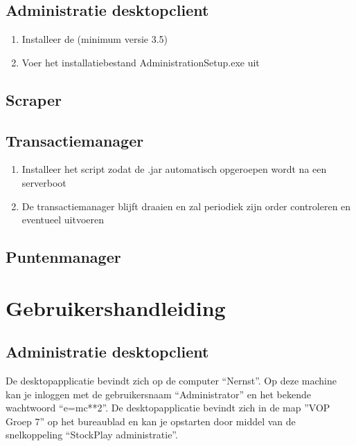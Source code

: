 \subsection{Administratie desktopclient}

\begin{enumerate}
\item Installeer de  (minimum versie 3.5)
\item{Voer het installatiebestand AdministrationSetup.exe uit}
\end{enumerate}

\subsection{Scraper}

\subsection{Transactiemanager}

\begin{enumerate}
\item{Installeer het script zodat de .jar automatisch opgeroepen wordt na een serverboot}
\item{De transactiemanager blijft draaien en zal periodiek zijn order controleren en eventueel uitvoeren}
\end{enumerate}

\subsection{Puntenmanager}



%
%

\section{Gebruikershandleiding}

\subsection{Administratie desktopclient}

De desktopapplicatie bevindt zich op de computer ``Nernst''.
Op deze machine kan je inloggen met de gebruikersnaam ``Administrator'' en het bekende wachtwoord ``e=mc**2''.
De desktopapplicatie bevindt zich in de map ''VOP Groep 7'' op het bureaublad en kan je opstarten door middel van de snelkoppeling ``StockPlay administratie''.


